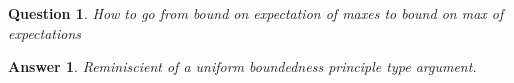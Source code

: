 \documentclass[11pt]{article}
\newtheorem{quest}{Question}
\newtheorem{ans}{Answer}
\begin{document}
\begin{quest}
	How to go from bound on expectation of maxes to bound on max of expectations
\end{quest}

\begin{ans}
	Reminiscient of a uniform boundedness principle type argument.
\end{ans}




\end{document}
